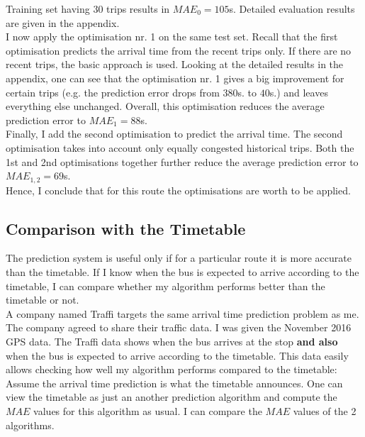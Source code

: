\documentclass[12pt,a4paper,oneside,openright]{report}
\begin{document}
Training set having $30$ trips results in $MAE_0 = 105$s. Detailed
evaluation results are given in the appendix. \\

I now apply the optimisation nr. 1 on the same test set. Recall that
the first optimisation predicts the arrival time from the recent trips only.
If there are no recent trips, the basic approach is used. Looking at the
detailed results in the appendix, one can see that the
optimisation nr. 1 gives a big improvement for certain trips (e.g. the
prediction error drops from $380$s. to $40$s.) and leaves everything else
unchanged. Overall, this optimisation reduces the average prediction error to
$MAE_1 = 88$s. \\

Finally, I add the second optimisation to predict the arrival time. The
second optimisation takes into account only equally congested historical trips.
Both the 1st and 2nd optimisations together further reduce the average
prediction error to $MAE_{1,2} = 69$s. \\

Hence, I conclude that for this route the optimisations are worth to be applied.

\newpage

\subsection*{Comparison with the Timetable}

The prediction system is useful only if for a particular route it is more accurate than
the timetable. If I know when the bus is expected to arrive according to the timetable,
I can compare whether my algorithm performs better than the timetable or not. \\

A company named Traffi targets the same arrival time prediction
problem as me. The company agreed to share their traffic
data. I was given the November 2016 GPS data. The Traffi data shows when the bus arrives
at the stop \textbf{and also} when the bus is expected to arrive according to the timetable.
This data easily allows checking how well my algorithm performs compared to the timetable: \\

Assume the arrival time prediction is what the timetable announces. One can view the
timetable as just an another prediction algorithm and compute the $MAE$ values for this
algorithm as usual. I can compare the $MAE$ values of the 2 algorithms. \\
\end{document}
